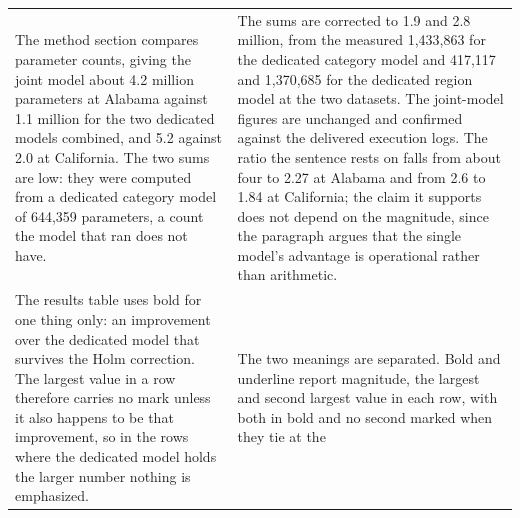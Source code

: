 \begin{table}[htb]
\begin{tabular}{@{}p{}p{}@{}}
The method section compares parameter counts, giving the joint model about 4.2 million
parameters at Alabama against 1.1 million for the two dedicated models combined, and 5.2
against 2.0 at California. The two sums are low: they were computed from a dedicated
category model of 644,359 parameters, a count the model that ran does not have. &
The sums are corrected to 1.9 and 2.8 million, from the measured 1,433,863 for the dedicated
category model and 417,117 and 1,370,685 for the dedicated region model at the two datasets.
The joint-model figures are unchanged and confirmed against the delivered execution logs. The
ratio the sentence rests on falls from about four to 2.27 at Alabama and from 2.6 to 1.84 at
California; the claim it supports does not depend on the magnitude, since the paragraph argues
that the single model's advantage is operational rather than arithmetic. \\
\addlinespace
The results table uses bold for one thing only: an improvement over the dedicated model
that survives the Holm correction. The largest value in a row therefore carries no mark
unless it also happens to be that improvement, so in the rows where the dedicated model
holds the larger number nothing is emphasized. &
The two meanings are separated. Bold and underline report magnitude, the largest and second
largest value in each row, with both in bold and no second marked when they tie at the

\end{tabular}
\end{table}
